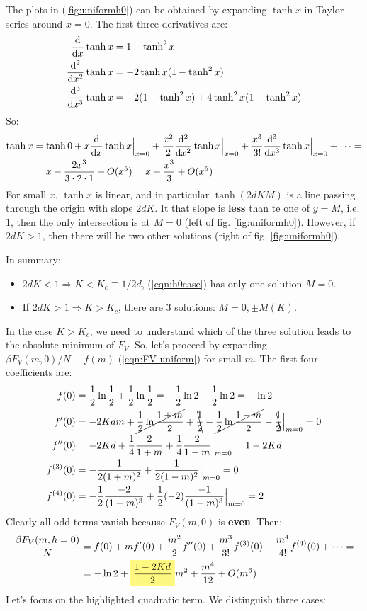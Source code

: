 \documentclass[../../main.tex]{subfiles}
\begin{document}
The plots in (\ref{fig:uniformh0}) can be obtained by expanding $\tanh x$ in Taylor series around $x = 0$. The first three derivatives are:
\begin{align*}
    \dv{x} \tanh x &= 1- \tanh^2 x\\
    \dv[2]{x} \tanh x &= -2 \tanh x(1-\tanh^2 x)\\
    \dv[3]{x} \tanh x &= -2(1-\tanh^2 x ) + 4\tanh^2 x (1-\tanh^2 x)
\end{align*}
So:
\begin{align*}
    \tanh x &= \tanh 0 +x \dv{x}\tanh x\Big|_{x=0} + \frac{x^2}{2} \dv[2]{x} \tanh x\Big|_{x=0} + \frac{x^3}{3!}\dv[3]{x} \tanh x\Big|_{x=0} + \dots = \\
    &= x -\frac{2x^3}{3\cdot 2 \cdot 1} + O(x^5) = x -\frac{x^3}{3} + O(x^5) 
\end{align*}
For small $x$, $\tanh x$ is linear, and in particular $\tanh(2d K M)$ is a line passing through the origin with slope $2dK$. It that slope is \textbf{less}  than te one of $y=M$, i.e. $1$, then the only intersection is at $M=0$ (left of fig. \ref{fig:uniformh0}). However, if $2dK > 1$, then there will be two other solutions (right of fig. \ref{fig:uniformh0}). 

In summary:
\begin{itemize}
    \item $2dK < 1 \Rightarrow K < K_c \equiv 1/2d$, (\ref{eqn:h0case}) has only one solution $M=0$.
    \item If $2dK > 1 \Rightarrow K > K_c$, there are $3$ solutions: $M=0, \pm M(K)$.
\end{itemize}

In the case $K > K_c$, we need to understand which of the three solution leads to the absolute minimum of $F_V$. So, let's proceed by expanding $\beta F_V(m,0)/N \equiv f(m)$ (\ref{eqn:FV-uniform}) for small $m$. The first four coefficients are:
\begin{align*}
    f(0) &= \frac{1}{2} \ln \frac{1}{2} + \frac{1}{2} \ln \frac{1}{2} = -\frac{1}{2} \ln 2 - \frac{1}{2}\ln 2 = -\ln 2\\
    f'(0) &= -2 K d m + \cancel{\frac{1}{2}\ln \frac{1+m}{2}} + \bcancel{\frac{1}{2}} -\cancel{\frac{1}{2}\ln \frac{1-m}{2}} -\bcancel{\frac{1}{2}} \Big|_{m=0} = 0\\
    f''(0) &= -2Kd +\frac{1}{4}\frac{2}{1+m} +\frac{1}{4}\frac{2}{1-m}\Big|_{m=0} = 1-2Kd    \\
    f^{(3)}(0) &= -\frac{1}{2(1+m)^2} + \frac{1}{2(1-m)^2} \Big|_{m=0} = 0  \\
    f^{(4)}(0) &= -\frac{1}{2}\frac{-2}{(1+m)^3} + \frac{1}{2}(-2)\frac{-1}{(1-m)^3} \Big|_{m=0} = 2    
\end{align*}
Clearly all odd terms vanish because $F_V(m,0)$ is \textbf{even}. Then: 
\begin{align*}
    \frac{\beta F_V(m, h=0)}{N} &= f(0) + mf'(0) + \frac{m^2}{2}f''(0) + \frac{m^3}{3!}f^{(3)}(0) + \frac{m^4}{4!}f^{(4)}(0) + \dots =\\
    &= -\ln 2 +\hlc{Yellow}{\frac{1-2Kd}{2}} m^2  + \frac{m^4}{12} + O(m^6) 
\end{align*}
Let's focus on the highlighted quadratic term. We distinguish three cases:
\end{document}
